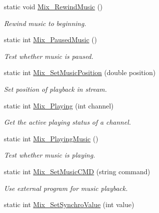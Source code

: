 \begin{DoxyCompactItemize}
static void \hyperlink{namespace_tao_1_1_sdl_ae1b8819a96e0ed61bca173b030667355}{Mix\_\-RewindMusic} ()
\begin{DoxyCompactList}\small\item\em Rewind music to beginning. \item\end{DoxyCompactList}\item 
static int \hyperlink{namespace_tao_1_1_sdl_a8a0635529536c080ac993ded5a114b02}{Mix\_\-PausedMusic} ()
\begin{DoxyCompactList}\small\item\em Test whether music is paused. \item\end{DoxyCompactList}\item 
static int \hyperlink{namespace_tao_1_1_sdl_abc899fd78a4798973d00f88ec6a31ab6}{Mix\_\-SetMusicPosition} (double position)
\begin{DoxyCompactList}\small\item\em Set position of playback in stream. \item\end{DoxyCompactList}\item 
static int \hyperlink{namespace_tao_1_1_sdl_a54b7a201ae1d44a66389848fdd2110c8}{Mix\_\-Playing} (int channel)
\begin{DoxyCompactList}\small\item\em Get the active playing status of a channel. \item\end{DoxyCompactList}\item 
static int \hyperlink{namespace_tao_1_1_sdl_ac811cacdff8d9eeb9ca1745f56b78b30}{Mix\_\-PlayingMusic} ()
\begin{DoxyCompactList}\small\item\em Test whether music is playing. \item\end{DoxyCompactList}\item 
static int \hyperlink{namespace_tao_1_1_sdl_aea359916fe9090b1e8c154e7704138d1}{Mix\_\-SetMusicCMD} (string command)
\begin{DoxyCompactList}\small\item\em Use external program for music playback. \item\end{DoxyCompactList}\item 
static int \hyperlink{namespace_tao_1_1_sdl_a19ab0f73e68a6e96ce16fcc040331f46}{Mix\_\-SetSynchroValue} (int value)

\end{DoxyCompactItemize}
